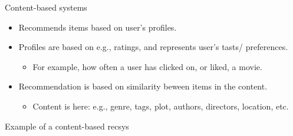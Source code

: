 \documentclass[handout]{beamer}
\begin{document}
\begin{frame}
	\begin{block}{Content-based systems}
		\begin{itemize}
			\item <1-> Recommends items based on user's profiles. 
			\item <2-> Profiles are based on e.g., ratings, and represents user's tasts/ preferences. 
			\begin{itemize}
				\item <3-> For example, how often a user has clicked on, or liked, a movie. 
			\end{itemize}
			\item <4-> Recommendation is based on \alert{similarity} beween items in the content.
			\begin{itemize}
				\item <5-> Content is here: e.g., genre, tags, plot, authors, directors, location, etc. 
			\end{itemize}
		\end{itemize}
	\end{block}
\end{frame}

\begin{frame}{Example of a content-based recsys}
\end{frame}
\end{document}
